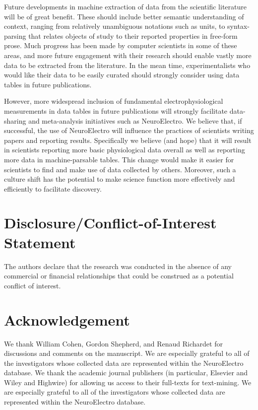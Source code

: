 \documentclass{template/frontiersSCNS} %
\begin{document}
Future developments in machine extraction of data from the scientific literature will be of great benefit.  
These should include better semantic understanding of context, ranging from relatively unambiguous notations such as units, to syntax-parsing that relates objects of study to their reported properties in free-form prose.  
Much progress has been made by computer scientists in some of these areas, and more future engagement with their research should enable vastly more data to be extracted from the literature.  
In the mean time, experimentalists who would like their data to be easily curated should strongly consider using data tables in future publications.  

However, more widespread inclusion of fundamental electrophysiological measurements in data tables in future publications will strongly facilitate data-sharing and meta-analysis initiatives such as NeuroElectro.  
We believe that, if successful, the use of NeuroElectro will influence the practices of scientists writing papers and reporting results.  
Specifically we believe (and hope) that it will result in scientists reporting more basic physiological data overall as well as reporting more data in machine-parsable tables.  
This change would make it easier for scientists to find and make use of data collected by others.  
Moreover, such a culture shift has the potential to make science function more effectively and efficiently to facilitate discovery.   

\section*{Disclosure/Conflict-of-Interest Statement}
The authors declare that the research was conducted in the absence of any commercial or financial relationships that could be construed as a potential conflict of interest.

\section*{Acknowledgement}
We thank William Cohen, Gordon Shepherd, and Renaud Richardet for discussions and comments on the manuscript. 
We are especially grateful to all of the investigators whose collected data are represented within the NeuroElectro database.  
We thank the academic journal publishers (in particular, Elsevier and Wiley and Highwire) for allowing us access to their full-texts for text-mining.  
We are especially grateful to all of the investigators whose collected data are represented within the NeuroElectro database.
\end{document}
